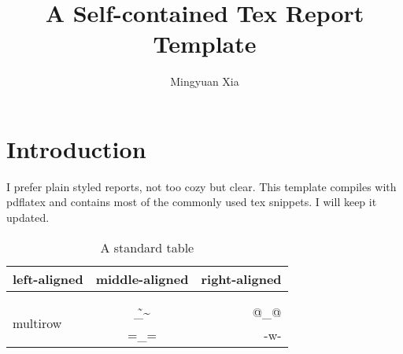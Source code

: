 \documentclass{article}
\title{A Self-contained Tex Report Template}
\author{Mingyuan Xia}
\begin{document}
\maketitle
\section{Introduction}
I prefer plain styled reports, not too cozy but clear. This template compiles with pdflatex and contains most of the commonly used tex snippets. I will keep it~\cite{echo} updated.
\begin{table}[h]
\centering
\begin{tabular}{|l|c|r|}
\hline
left-aligned & middle-aligned & right-aligned \\
\hline \hline
& \cellcolor[gray]{0.9} & \\
\hline
& & \\
\multirow{2}{*}{multirow}
& \~\_\~ & @\_@ \\
& =\_= & -w- \\
\hline
\end{tabular}
\caption{A standard table}
\label{tab:eample}
\end{table}

{
\footnotesize


}
\end{document}
